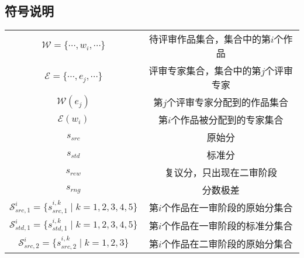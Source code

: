 \documentclass[bwprint]{gmcmthesis}
\begin{document}
\subsection{符号说明}

\begin{tabular}{cc}
	\midrule[1pt]
	\makebox[0.4\textwidth][c]{符号} &  \makebox[0.5\textwidth][c]{意义} \\ \midrule[1pt]\midrule[1pt]
	$\mathcal{W}=\{\cdots,w_i,\cdots\}$    & 待评审作品集合，集合中的第$i$个作品 \\ \hline
	$\mathcal{E}=\{\cdots,e_j,\cdots\}$    & 评审专家集合，集合中的第$j$个评审专家 \\ \hline
	$\mathcal{W}(e_j)$    & 第$j$个评审专家分配到的作品集合 \\ \hline
	$\mathcal{E}(w_i)$    & 第$i$个作品被分配到的专家集合 \\ \hline
	$s_{src}$    & 原始分 \\ \hline
	$s_{std}$    & 标准分 \\ \hline
	$s_{rew}$    & 复议分，只出现在二审阶段 \\ \hline
	$s_{rng}$    & 分数极差\\ \hline
	$\mathcal{S}^i_{src,1}=\{s^{i,k}_{src,1}\;\vert\; k=1,2,3,4,5\}$    & 第$i$个作品在一审阶段的原始分集合  \\ \hline
	$\mathcal{S}^i_{std,1}=\{s^{i,k}_{std,1}\;\vert\; k=1,2,3,4,5\}$    & 第$i$个作品在一审阶段的标准分集合  \\ \hline
	$\mathcal{S}^i_{src,2}=\{s^{i,k}_{src,2}\;\vert\; k=1,2,3\}$    & 第$i$个作品在二审阶段的原始分集合  \\ \midrule[1pt]
\end{tabular}
\end{document}

